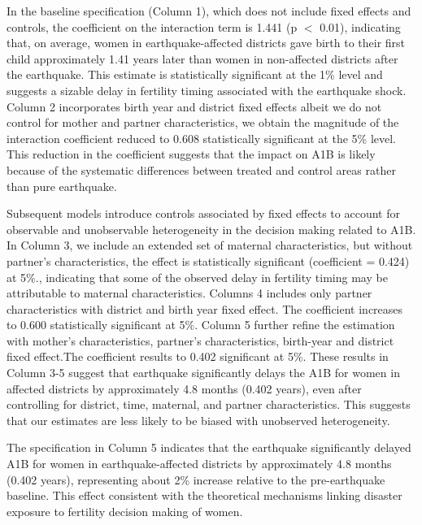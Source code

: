 \documentclass[11pt,a4paper]{article}
\begin{document}
In the baseline specification (Column 1), which does not include fixed effects and controls, the coefficient on the interaction term is 1.441 (p $<$ 0.01), indicating that, on average, women in earthquake-affected districts gave birth to their first child approximately 1.41 years later than women in non-affected districts after the earthquake. This estimate is statistically significant at the 1\% level and suggests a sizable delay in fertility timing associated with the earthquake shock. Column 2 incorporates birth year and district fixed effects albeit we do not control for mother and partner characteristics, we obtain the magnitude of the interaction coefficient reduced to 0.608 statistically significant at the 5\% level. This reduction in the coefficient suggests that the impact on A1B is likely because of the systematic differences between treated and control areas rather than pure earthquake.

\vspace{0.25cm}

Subsequent models introduce controls associated by fixed effects to account for observable and unobservable heterogeneity in the decision making related to A1B. In Column 3, we include an extended set of maternal characteristics, but without partner's characteristics, the effect is statistically significant (coefficient = 0.424) at 5\%., indicating that some of the observed delay in fertility timing may be attributable to maternal characteristics.
Columns 4 includes only partner characteristics with district and birth year fixed effect. The coefficient increases to 0.600 statistically significant at 5\%. Column 5 further refine the estimation with mother's characteristics, partner's characteristics, birth-year and district fixed effect.The coefficient results to 0.402 significant at 5\%. These results in Column 3-5 suggest that earthquake significantly delays the A1B for women in affected districts by approximately 4.8 months (0.402 years), even after controlling for district, time, maternal, and partner characteristics. This suggests that our estimates are less likely to be biased with unobserved heterogeneity.

\vspace{0.25cm}

The specification in Column 5 indicates that the earthquake significantly delayed A1B for women in earthquake-affected districts by approximately 4.8 months (0.402 years), representing about 2\% increase relative to the pre-earthquake baseline. This effect consistent with the theoretical mechanisms linking disaster exposure to fertility decision making of women. 
\end{document}
